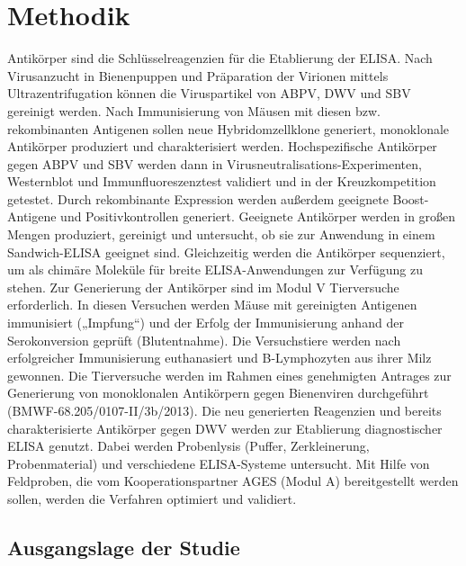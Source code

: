 \section{Methodik}

Antikörper sind die Schlüsselreagenzien für die Etablierung der ELISA. Nach Virusanzucht in Bienenpuppen und Präparation der Virionen mittels Ultrazentrifugation können die Viruspartikel von ABPV, DWV und SBV gereinigt werden. Nach Immunisierung von Mäusen mit diesen bzw. rekombinanten Antigenen sollen neue Hybridomzellklone generiert, monoklonale Antikörper produziert und charakterisiert werden. Hochspezifische Antikörper gegen ABPV und SBV werden dann in Virusneutralisations-Experimenten, Westernblot und Immunfluoreszenztest validiert und in der Kreuzkompetition getestet. Durch rekombinante Expression werden außerdem geeignete Boost-Antigene und Positivkontrollen generiert. Geeignete Antikörper werden in großen Mengen produziert, gereinigt und untersucht, ob sie zur Anwendung in einem Sandwich-ELISA geeignet sind. Gleichzeitig werden die Antikörper sequenziert, um als chimäre Moleküle für breite ELISA-Anwendungen zur Verfügung zu stehen. Zur Generierung der Antikörper sind im Modul V Tierversuche erforderlich. In diesen Versuchen werden Mäuse mit gereinigten Antigenen immunisiert („Impfung“) und der Erfolg der Immunisierung anhand der Serokonversion geprüft (Blutentnahme). Die Versuchstiere werden nach erfolgreicher Immunisierung euthanasiert und B-Lymphozyten aus ihrer Milz gewonnen. Die Tierversuche werden im Rahmen eines genehmigten Antrages zur Generierung von monoklonalen Antikörpern gegen Bienenviren durchgeführt (BMWF-68.205/0107-II/3b/2013). Die neu generierten Reagenzien und bereits charakterisierte Antikörper gegen DWV werden zur Etablierung diagnostischer ELISA genutzt. Dabei werden Probenlysis (Puffer, Zerkleinerung, Probenmaterial) und verschiedene ELISA-Systeme untersucht. Mit Hilfe von Feldproben, die vom Kooperationspartner AGES (Modul A) bereitgestellt werden sollen, werden die Verfahren optimiert und validiert.

\subsection{Ausgangslage der Studie}

